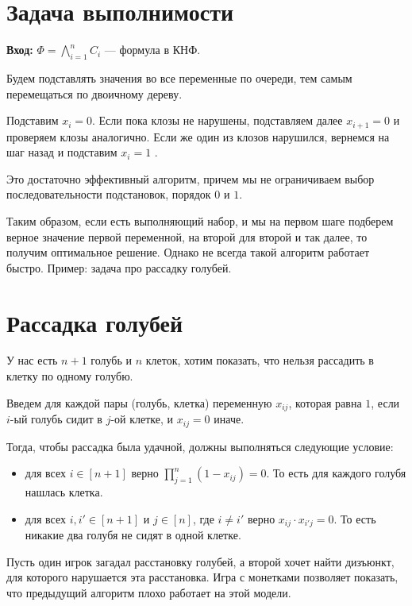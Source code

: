 \section{Задача выполнимости}
\textbf{Вход:} $ \Phi = \bigwedge\limits_{i=1}^n C_i $  --- формула в КНФ.

Будем подставлять значения во все переменные по очереди, тем самым перемещаться по двоичному дереву.

Подставим $ x_i = 0$. Если пока клозы не нарушены, подставляем далее $ x_{i+1} = 0$ и проверяем клозы аналогично. Если же один из клозов нарушился, вернемся на шаг назад и подставим $  x_i = 1$ .

\begin{figure}[ht]
    \centering
    \label{fig:cnf-algo}
\end{figure}

Это достаточно эффективный алгоритм, причем мы не ограничиваем выбор последовательности подстановок, порядок $ 0$ и $ 1$.

Таким образом, если есть выполняющий набор, и мы на первом шаге подберем верное значение первой переменной, на второй для второй и так далее, то получим оптимальное решение. Однако не всегда такой алгоритм работает быстро. Пример: задача про рассадку голубей.

\section{Рассадка голубей}
У нас есть $n+1$ голубь и $n$ клеток, хотим показать, что нельзя рассадить в клетку по одному голубю.

Введем для каждой пары (голубь, клетка) переменную $ x_{ij}$, которая равна $ 1$, если $ i$-ый голубь сидит в $ j$-ой клетке, и $ x_{ij} = 0$ иначе.

Тогда, чтобы рассадка была удачной, должны выполняться следующие условие: 
\begin{itemize}
	\item для всех $i \in [n+1]$ верно $ \prod_{j=1}^{n} (1-x_{ij}) = 0$. То есть для каждого голубя нашлась клетка.
	\item для всех $ i, i'\in [n+1]$ и $ j \in [n]$, где  $ i \ne i'$ верно $x_{ij} \cdot x_{i'j} = 0$. То есть никакие два голубя не сидят в одной клетке.
\end{itemize}
Пусть один игрок загадал расстановку голубей, а второй хочет найти дизъюнкт, для которого нарушается эта расстановка. 
Игра с монетками позволяет показать, что предыдущий алгоритм плохо работает на этой модели.

